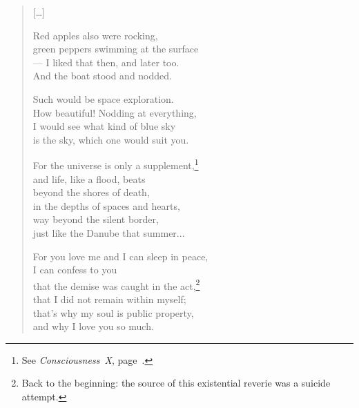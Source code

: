 \documentclass[11pt]{book}
\newcommand*{\centeredornament}{\centerline{\pgfornament[width=6cm]{88}}}
\begin{document}
\begin{verse}
  \textnormal{[\ldots]}

  Red apples also were rocking, \\
  green peppers swimming at the surface \\
  --- I liked that then, and later too. \\
  And the boat stood and nodded.

  Such would be space exploration. \\
  How beautiful! Nodding at everything, \\
  I would see what kind of blue sky \\
  is the sky, which one would suit you.

  For the universe is only a supplement,\footnote{See
  \emph{Consciousness~X}, page~\pageref{consciousness_X}.} \\
  and life, like a flood, beats \\
  beyond the shores of death, \\
  in the depths of spaces and hearts, \\
  way beyond the silent border, \\
  just like the Danube that summer...

  For you love me and I can sleep in peace, \\
  I can confess to you \\
  that the demise was caught in the act,\footnote{Back to the
  beginning: the source of this existential reverie was a suicide
  attempt.} \\
  that I did not remain within myself; \\
  that's why my soul is public property, \\
  and why I love you so much.
\end{verse}

\newpage

\vspace*{-15mm}
\centeredornament


\end{document}
